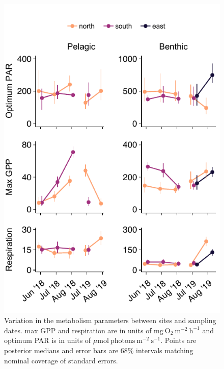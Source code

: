 \documentclass[12pt]{article}
\begin{document}
{\begin{figure}
\centering
\linespread{1}
\includegraphics{../analysis/figures/fig_par.pdf}
\caption{\label{fig:par}
Variation in the metabolism parameters between sites and sampling dates.
max GPP and respiration are in units of $\text{mg}~\text{O}_2~\text{m}^{-2}~\text{h}^{-1}$
and optimum PAR is in units of $\mu\text{mol}~\text{photons}~\text{m}^{-2}~\text{s}^{-1}$.
Points are posterior medians 
and error bars are 68\% intervals matching nominal coverage of standard errors.
}
\end{figure}

\clearpage


}
\end{document}
